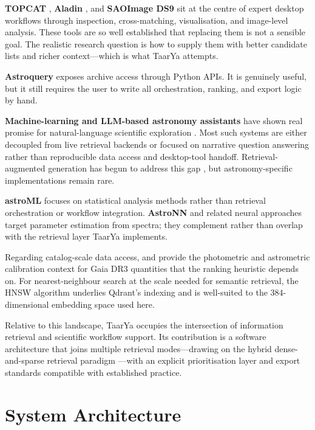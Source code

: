 \documentclass[12pt]{elsarticle}
\begin{document}
\textbf{TOPCAT} \citep{Taylor2005}, \textbf{Aladin} \citep{Bonnarel2000}, and \textbf{SAOImage DS9} \citep{Joye2003} sit at the centre of expert desktop workflows through inspection, cross-matching, visualisation, and image-level analysis. These tools are so well established that replacing them is not a sensible goal. The realistic research question is how to supply them with better candidate lists and richer context---which is what \textsf{TaarYa} attempts.

\textbf{Astroquery} \citep{Ginsburg2019} exposes archive access through Python APIs. It is genuinely useful, but it still requires the user to write all orchestration, ranking, and export logic by hand.

\textbf{Machine-learning and LLM-based astronomy assistants} have shown real promise for natural-language scientific exploration \citep{ UniverseTBD2023, Nguyen2023}. Most such systems are either decoupled from live retrieval backends or focused on narrative question answering rather than reproducible data access and desktop-tool handoff. Retrieval-augmented generation has begun to address this gap \citep{Lewis2020}, but astronomy-specific implementations remain rare.

\textbf{astroML} \citep{VanderPlas2012} focuses on statistical analysis methods rather than retrieval orchestration or workflow integration. \textbf{AstroNN} \citep{Leung2019} and related neural approaches target parameter estimation from spectra; they complement rather than overlap with the retrieval layer \textsf{TaarYa} implements.

Regarding catalog-scale data access, \citet{Riello2021} and \citet{Fabricius2021} provide the photometric and astrometric calibration context for Gaia DR3 quantities that the ranking heuristic depends on. For nearest-neighbour search at the scale needed for semantic retrieval, the HNSW algorithm \citep{Malkov2020} underlies Qdrant's indexing and is well-suited to the 384-dimensional embedding space used here.

Relative to this landscape, \textsf{TaarYa} occupies the intersection of information retrieval and scientific workflow support. Its contribution is a software architecture that joins multiple retrieval modes---drawing on the hybrid dense-and-sparse retrieval paradigm \citep{Karpukhin2020}---with an explicit prioritisation layer and export standards compatible with established practice.

\section{System Architecture}
\label{sec:architecture}
\end{document}
